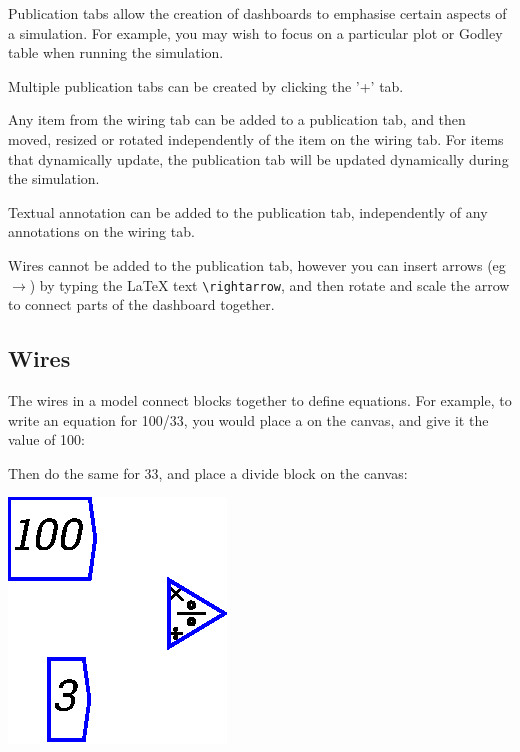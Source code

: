 Publication tabs allow the creation of dashboards to emphasise certain
aspects of a simulation. For example, you may wish to focus on a
particular plot or Godley table when running the simulation.

Multiple publication tabs can be created by clicking the '+' tab.

Any item from the wiring tab can be added to a publication tab, and
then moved, resized or rotated independently of the item on the wiring
tab. For items that dynamically update, the publication tab will be
updated dynamically during the simulation.

Textual annotation can be added to the publication tab, independently
of any annotations on the wiring tab.

Wires cannot be added to the publication tab, however you can insert
arrows (eg $\rightarrow$) by typing the LaTeX text \verb+\rightarrow+,
and then rotate and scale the arrow to connect parts of the dashboard together.

\subsection{Wires}
\label{Wires}

The wires in a model connect blocks together to define equations. For example, to write an equation for 100/33, you would place a  on the canvas, and give it the value of 100:

\begin{center}
\end{center}

Then do the same for 33, and place a divide block on the canvas:

\begin{center}
\includegraphics{images/NewItem123.eps}
\end{center}

